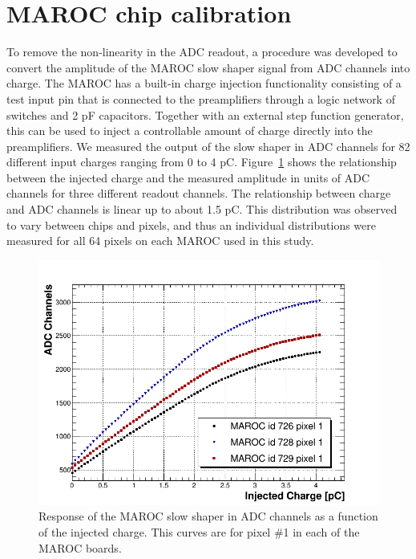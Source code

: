 \section{MAROC chip calibration}

To remove the non-linearity in the ADC readout, a procedure was developed to convert the amplitude of the MAROC slow shaper signal from ADC channels into charge. The MAROC has a built-in charge injection functionality consisting of a test input pin that is connected to the preamplifiers through a logic network of switches and 2 pF capacitors.
Together with an external step function generator, this can be used to inject a controllable amount of charge directly into the preamplifiers. We measured the output of the slow shaper in ADC channels for 82 different input charges ranging from 0 to 4 pC.
Figure~\ref{fig:MAROCcalib} shows the relationship between the injected charge and the measured amplitude in units of ADC channels for three different readout channels. The relationship between charge and ADC channels is linear up to about 1.5 pC.
This distribution was observed to vary between chips and pixels, and thus an individual distributions were measured for all 64 pixels on each MAROC used in this study. 

\begin{figure}[hbt]
	\centering
	\includegraphics[width=\linewidth]{figures/adc_v_charge.png}
	\caption{Response of the MAROC slow shaper in ADC channels as a function of the injected charge. This curves are for pixel \#1 in each of the MAROC boards.}
	\label{fig:MAROCcalib}
\end{figure}

